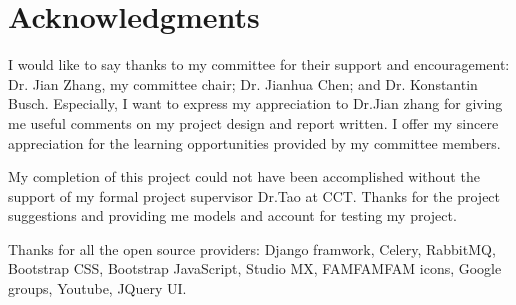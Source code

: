 \cleardoublepage
{}
{}
\chapter*{Acknowledgments}
\vspace{1.0in}

I would like to say thanks to my committee for their support and encouragement: Dr. Jian Zhang, my committee chair; Dr. Jianhua Chen; and Dr. Konstantin Busch. Especially, I want to express my appreciation to Dr.Jian zhang for giving me useful comments on my project design and report written. I offer my sincere appreciation for the learning opportunities provided by my committee members.

My completion of this project could not have been accomplished without the support of 
my formal project supervisor Dr.Tao at CCT. Thanks for the project suggestions and providing me models and account for testing my project.

Thanks for all the open source providers:
Django framwork, Celery, RabbitMQ, Bootstrap CSS, Bootstrap JavaScript, Studio MX, FAMFAMFAM icons, Google groups, Youtube, JQuery UI.

\newpage
